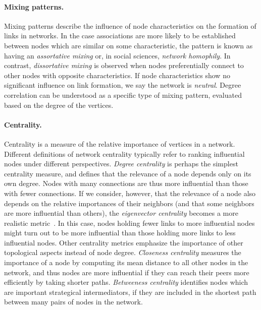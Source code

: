 \paragraph*{Mixing patterns.}
Mixing patterns describe the influence of node characteristics on the formation of links in networks.
In the case associations are more likely to be established between nodes which are similar on some characteristic, the pattern is known as having an \textit{assortative mixing} or, in social sciences, \textit{network homophily}.
In contrast, \textit{dissortative mixing} is observed when nodes preferentially connect to other nodes with opposite characteristics. 
If node characteristics show no significant influence on link formation, we say the network is \textit{neutral}.
Degree correlation can be understood as a specific type of mixing pattern, evaluated based on the degree of the vertices.

\paragraph*{Centrality.}
Centrality is a measure of the relative importance of vertices in a network. 
Different definitions of network centrality typically refer to ranking influential nodes under different perspectives.
\textit{Degree centrality} is perhaps the simplest centrality measure, and defines that the relevance of a node depends only on its own degree. Nodes with many connections are thus more influential than those with fewer connections.
If we consider, however, that the relevance of a node also depends on the relative importances of their neighbors (and that some neighbors are more influential than others), the \textit{eigenvector centrality} becomes a more realistic metric~\cite{Bonacich1987}.
In this case, nodes holding fewer links to more influential nodes might turn out to be more influential than those holding more links to less influential nodes.
Other centrality metrics emphasize the importance of other topological aspects instead of node degree.
\textit{Closeness centrality} measures the importance of a node by computing its mean distance to all other nodes in the network, and thus nodes are more influential if they can reach their peers more efficiently by taking shorter paths.
\textit{Betweeness centrality} identifies nodes which are important strategical intermediators, if they are included in the shortest path between many pairs of nodes in the network.  

